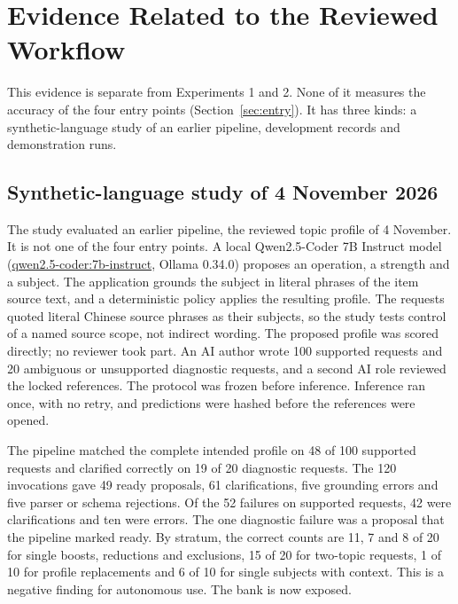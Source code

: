 \documentclass[conference]{IEEEtran}
\begin{document}
\section{Evidence Related to the Reviewed Workflow}
This evidence is separate from Experiments 1 and 2. None of it measures the accuracy of the four entry points (Section~\ref{sec:entry}). It has three kinds: a synthetic-language study of an earlier pipeline, development records and demonstration runs.

\subsection{Synthetic-language study of 4 November 2026}
The study evaluated an earlier pipeline, the reviewed topic profile of 4 November. It is not one of the four entry points. A local Qwen2.5-Coder 7B Instruct model (\url{qwen2.5-coder:7b-instruct}, Ollama 0.34.0) proposes an operation, a strength and a subject. The application grounds the subject in literal phrases of the item source text, and a deterministic policy applies the resulting profile. The requests quoted literal Chinese source phrases as their subjects, so the study tests control of a named source scope, not indirect wording. The proposed profile was scored directly; no reviewer took part. An AI author wrote 100 supported requests and 20 ambiguous or unsupported diagnostic requests, and a second AI role reviewed the locked references. The protocol was frozen before inference. Inference ran once, with no retry, and predictions were hashed before the references were opened.

The pipeline matched the complete intended profile on 48 of 100 supported requests and clarified correctly on 19 of 20 diagnostic requests. The 120 invocations gave 49 ready proposals, 61 clarifications, five grounding errors and five parser or schema rejections. Of the 52 failures on supported requests, 42 were clarifications and ten were errors. The one diagnostic failure was a proposal that the pipeline marked ready. By stratum, the correct counts are 11, 7 and 8 of 20 for single boosts, reductions and exclusions, 15 of 20 for two-topic requests, 1 of 10 for profile replacements and 6 of 10 for single subjects with context. This is a negative finding for autonomous use. The bank is now exposed.
\end{document}
